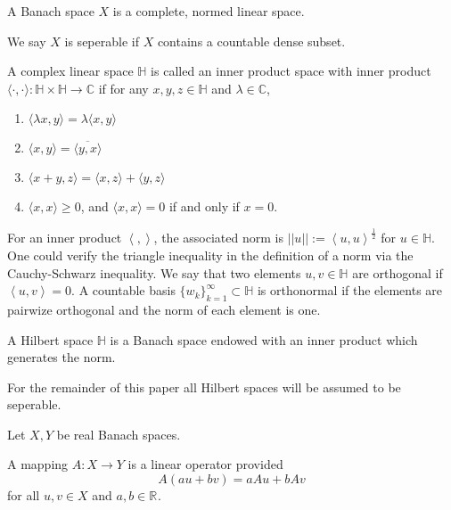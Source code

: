 \begin{definition}
  A Banach space $X$ is a complete, normed linear space.
\end{definition}

\begin{definition}
  We say $X$ is seperable if $X$ contains a countable dense subset.
\end{definition}

\begin{definition}
  A complex linear space $\mathbb{H}$ is called an inner product space with inner product $ \langle \cdot, \cdot \rangle  : \mathbb{H} \times \mathbb{H} \to \mathbb{C} $ if for any $x,y,z \in \mathbb{H}$ and $\lambda \in \mathbb{C}$,
  \begin{enumerate}
    \item $ \langle \lambda x, y \rangle = \lambda \langle x, y \rangle  $
    \item $ \langle x,y \rangle = \overline{ \langle y,x \rangle }$
    \item $ \langle x + y, z \rangle = \langle x,z \rangle + \langle y,z \rangle $
    \item $ \langle x,x \rangle \geq 0$, and $ \langle x,x \rangle = 0 $ if and only if $x = 0$.
  \end{enumerate}
\end{definition}

For an inner product $ \left< , \right>$, the associated norm is $|| u || := \left< u,u \right>^{\frac{1}{2}}$ for $u \in \mathbb{H}$.
One could verify the triangle inequality in the definition of a norm via the Cauchy-Schwarz inequality.
We say that two elements $u,v \in \mathbb{H}$ are orthogonal if $\left< u,v \right> = 0$.
A countable basis $\{w_{k}\}_{k=1}^\infty \subset \mathbb{H}$ is orthonormal if the elements are pairwize orthogonal and the norm of each element is one.


\begin{definition}
  A Hilbert space $\mathbb{H}$ is a Banach space endowed with an inner product which generates the norm.
\end{definition}
For the remainder of this paper all Hilbert spaces will be assumed to be seperable.

Let $X,Y$ be real Banach spaces.
\begin{definition}
  A mapping $ A : X \to Y $ is a linear operator provided
  \[
  A(au + bv) = aAu + bAv
  \] 
  for all $u,v \in X$ and $a,b \in \mathbb{R}^{} $.
\end{definition}

